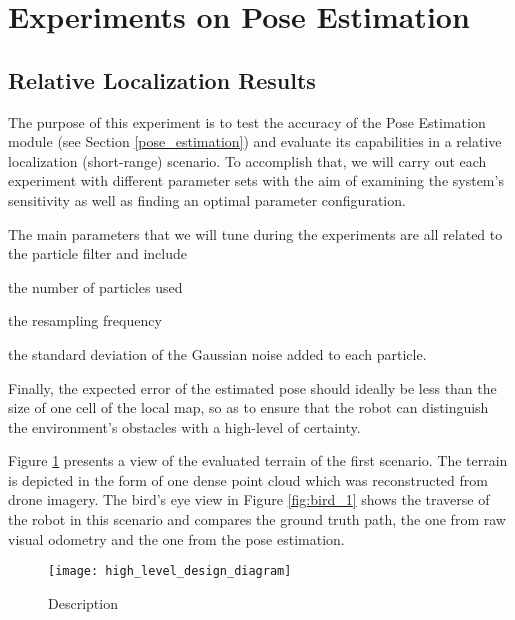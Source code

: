 \section{Experiments on Pose Estimation}

\subsection{Relative Localization Results}

The purpose of this experiment is to test the accuracy of the Pose Estimation
module (see Section \ref{pose_estimation}) and evaluate its capabilities
in a relative localization (short-range) scenario.
To accomplish that, we will carry out each experiment with different parameter
sets with the aim of examining the system's sensitivity as well as finding an
optimal parameter configuration.

The main parameters that we will tune during the experiments are all related
to the particle filter and include
\begin{enumerate*}[label=(\roman*)]
        \item the number of particles used
        \item the resampling frequency
        \item the standard deviation of the Gaussian noise
            added to each particle.
\end{enumerate*}
Finally, the expected error of the estimated pose should
ideally be less than the size of one cell of the local map, so as to
ensure that the robot can distinguish the environment's obstacles with
a high-level of certainty.

Figure \ref{fig:terrain_1} presents a view of the evaluated terrain of the
first scenario.
The terrain is depicted in the form of one dense point cloud which was
reconstructed from drone imagery.
The bird's eye view in Figure \ref{fig:bird_1} shows the traverse of the
robot in this scenario and compares the ground truth path, the one
from raw visual odometry and the one from the pose estimation.

\begin{figure}
    \centering
    \texttt{[image: high\_level\_design\_diagram]}
    \caption[Name]{
        Description
    }
    \label{fig:terrain_1}
\end{figure}

